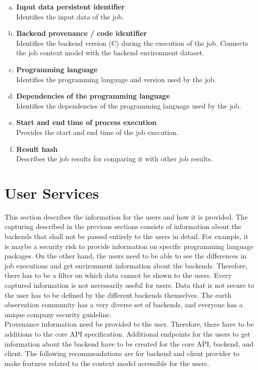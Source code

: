 \documentclass[draft,final]{vutinfth} %
\begin{document}
\begin{enumerate}[(a)]
	\item \textbf{Input data persistent identifier} \\
	Identifies the input data of the job.
	\item \textbf{Backend provenance / code identifier} \\
	Identifies the backend version (C) during the execution of the job. Connects the job context model with the backend environment dataset.
	\item \textbf{Programming language} \\
	Identifies the programming language and version used by the job.
	\item \textbf{Dependencies of the programming language} \\
	Identifies the dependencies of the programming language used by the job.
	\item \textbf{Start and end time of process execution} \\
	Provides the start and end time of the job execution.
	\item \textbf{Result hash} \\
	Describes the job results for comparing it with other job results.
\end{enumerate}

\section{User Services}\label{Design:User Interface}

This section describes the information for the users and how it is provided. The capturing described in the previous sections consists of information about the backends that shall not be passed entirely to the users in detail. For example, it is maybe a security risk to provide information on specific programming language packages. On the other hand, the users need to be able to see the differences in job executions and get environment information about the backends. Therefore, there has to be a filter on which data cannot be shown to the users. Every captured information is not necessarily useful for users. Data that is not secure to the user has to be defined by the different backends themselves. The earth observation community has a very diverse set of backends, and everyone has a unique company security guideline.\\ 
Provenance information need be provided to the user. Therefore, there have to be additions to the core API specification. Additional endpoints for the users to get information about the backend have to be created for the core API, backend, and client. The following recommendations are for backend and client provider to make features related to the context model accessible for the users.
\end{document}
